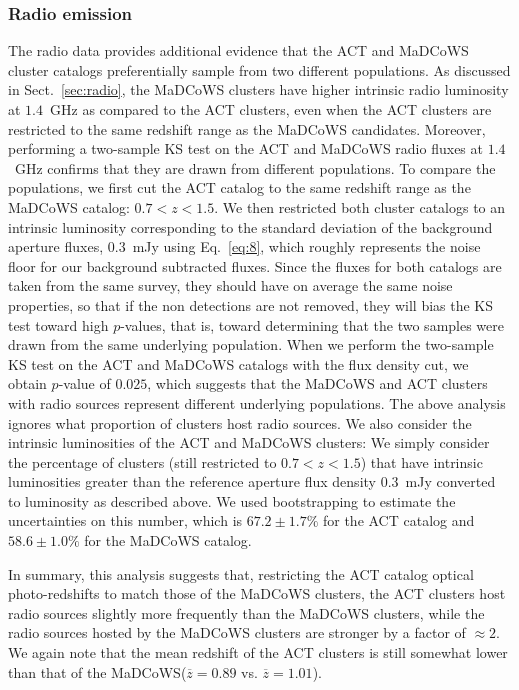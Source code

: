 \documentclass[longauth]{aa} %
\newcommand{\madcows}{MaDCoWS\xspace}
\begin{document}
\subsubsection{Radio emission}\label{sec:radio_disc}
The radio data provides additional evidence that the ACT and MaDCoWS cluster catalogs preferentially sample from two different populations. As discussed in Sect.~\ref{sec:radio}, the \madcows clusters have higher intrinsic radio luminosity at $1.4$~GHz as compared to the ACT clusters, even when the ACT clusters are restricted to the same redshift range as the \madcows candidates. Moreover, performing a two-sample KS test on the ACT and MaDCoWS radio fluxes at $1.4$~GHz confirms that they are drawn from different populations. To compare the populations, we first cut the ACT catalog to the same redshift range as the \madcows catalog: $0.7<z<1.5$. We then restricted both cluster catalogs to an intrinsic luminosity corresponding to the standard deviation of the background aperture fluxes, $0.3$~mJy using Eq.~\ref{eq:8}, which roughly represents the noise floor for our background subtracted fluxes. Since the fluxes for both catalogs are taken from the same survey, they should have on average the same noise properties, so that if the non detections are not removed, they will bias the KS test toward high $p$-values, that is, toward determining that the two samples were drawn from the same underlying population. When we perform the two-sample KS test on the ACT and \madcows catalogs with the flux density cut, we obtain $p$-value of $0.025$, which suggests that the \madcows and ACT clusters with radio sources represent different underlying populations. The above analysis ignores what proportion of clusters host radio sources. We also consider the intrinsic luminosities of the ACT and \madcows clusters: We simply consider the percentage of clusters (still restricted to $0.7<z<1.5$) that have intrinsic luminosities greater than the reference aperture flux density $0.3$~mJy converted to luminosity as described above. We used bootstrapping to estimate the uncertainties on this number, which is $67.2\pm 1.7\%$ for the ACT catalog and $58.6\pm 1.0\%$ for the \madcows catalog. 

In summary, this analysis suggests that, restricting the ACT catalog optical photo-redshifts to match those of the \madcows clusters, the ACT clusters host radio sources slightly more frequently than the \madcows clusters, while the radio sources hosted by the \madcows clusters are stronger by a factor of $\approx 2$. We again note that the mean redshift of the ACT clusters is still somewhat lower than that of the \madcows ($\overline{z} = 0.89$ vs. $\overline{z} = 1.01$). 
\end{document}
